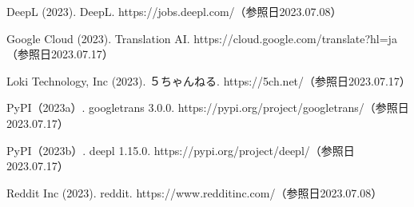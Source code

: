 \documentclass[b5paper,12pt]{jsreport}
\begin{document}
\begin{thebibliography}{99}
DeepL (2023). DeepL. https://jobs.deepl.com/（参照日2023.07.08）

Google Cloud (2023). Translation AI. https://cloud.google.com/translate?hl=ja（参照日2023.07.17）

Loki Technology, Inc (2023). ５ちゃんねる. https://5ch.net/（参照日2023.07.17）

PyPI（2023a）. googletrans 3.0.0. https://pypi.org/project/googletrans/（参照日2023.07.17）

PyPI（2023b）. deepl 1.15.0. https://pypi.org/project/deepl/（参照日2023.07.17）

Reddit Inc (2023). reddit. https://www.redditinc.com/（参照日2023.07.08）

\end{thebibliography}
    
\end{document}
